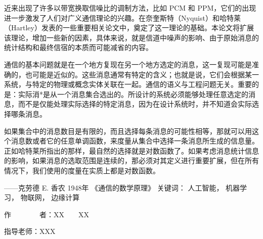 
\begin{cabstract}
	近来出现了许多以带宽换取信噪比的调制方法，比如 PCM 和 PPM，它们的出现进一步激发了人们对广义通信理论的兴趣。在奈奎斯特（Nyquist）和哈特莱（Hartley）发表的一些重要相关论文中，奠定了这一理论的基础。本论文将扩展该理论，增加一些新的因素，具体来说，就是信道中噪声的影响、由于原始消息的统计结构和最终信宿的本质而可能减省的内容。

	通信的基本问题就是在一个地方复现在另一个地方选定的消息，这一复现可能是准确的，也可能是近似的。这些消息通常有特定的含义；也就是说，它们会根据某一系统，与特定的物理或概念实体关联在一起。通信的语义与工程问题无关。重要的是：实际消*是从一个消息集合选出的。所设计的系统必须能够处理任意选定的消息，而不是仅能处理实际选择的特定消息，因为在设计系统时，并不知道会实际选择哪条消息。
	
	如果集合中的消息数目是有限的，而且选择每条消息的可能性相等，那就可以用这个消息数或者它的任意单调函数，来度量从集合中选择一条消息所生成的信息量。正如哈特莱所指出的那样，最自然的选择就是对数函数了。如果考虑消息统计信息的影响，如果消息的选取范围是连续的，那必须对其定义进行重要扩展，但在所有情况下，我们使用的度量在实质上都是对数函数。
	
	——克劳德 E. 香农 1948年 《通信的数学原理》
	\vskip 21bp
	{\heiti{} 关键词：}
	人工智能，
	机器学习，
	物联网，
	边缘计算
	
	\begin{flushright}
		作~~~~~~~~者：XX~~~~XX
		
		指导老师：XXX
		
	\end{flushright}
\end{cabstract}


